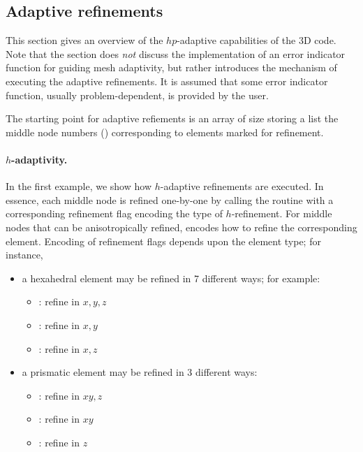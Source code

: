 \subsection{Adaptive refinements}
\label{sec:adaptive-refinements}

This section gives an overview of the $hp$-adaptive capabilities of the \hp3D code. Note that the section does \emph{not} discuss the implementation of an error indicator function for guiding mesh adaptivity, but rather introduces the mechanism of executing the adaptive refinements. It is assumed that some error indicator function, usually problem-dependent, is provided by the user. 

The starting point for adaptive refiements is an array  of size  storing a list the middle node numbers () corresponding to elements marked for refinement. 

\paragraph{$h$-adaptivity.}
In the first example, we show how $h$-adaptive refinements are executed. In essence, each middle node is refined one-by-one by calling the  routine with a corresponding refinement flag  encoding the type of $h$-refinement. For middle nodes that can be anisotropically refined,  encodes how to refine the corresponding element. Encoding of refinement flags depends upon the element type; for instance,
\begin{itemize}
	\item a hexahedral element may be refined in 7 different ways; for example:
	\begin{itemize}
		\itemsep 0pt
		\item {} : refine in $x,y,z$
		\item {} : refine in $x,y$
		\item {} : refine in $x,z$
	\end{itemize}
	\item a prismatic element may be refined in 3 different ways:
	\begin{itemize}
		\itemsep 0pt
		\item {} : refine in $xy,z$
		\item {} : refine in $xy$
		\item {} : refine in $z$
	\end{itemize}
\end{itemize}

